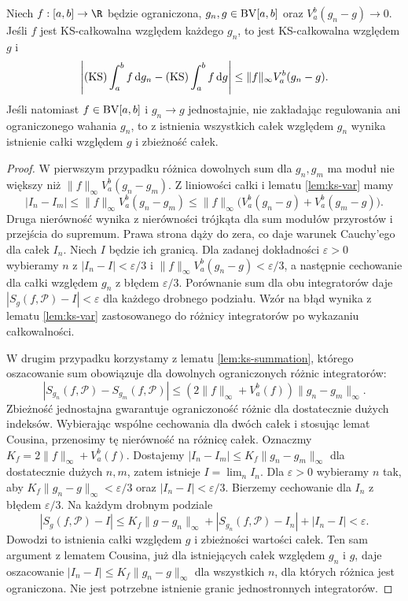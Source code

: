 \begin{twierdzenie}\label{ma1:kh:thm:ks-integrator-limit}
Niech $f:[a,b]\to\R$ będzie ograniczona, $g_n,g\in\mathrm{BV}[a,b]$ oraz $V_a^b(g_n-g)\to0$. Jeśli $f$ jest KS-całkowalna względem każdego $g_n$, to jest KS-całkowalna względem $g$ i
\[
 \left|(\mathrm{KS})\int_a^b f\,\mathrm dg_n-(\mathrm{KS})\int_a^b f\,\mathrm dg\right|
 \le\|f\|_\infty V_a^b(g_n-g).
\]
Jeśli natomiast $f\in\mathrm{BV}[a,b]$ i $g_n\to g$ jednostajnie, nie zakładając regulowania ani ograniczonego wahania $g_n$, to z istnienia wszystkich całek względem $g_n$ wynika istnienie całki względem $g$ i zbieżność całek.
\end{twierdzenie}
\begin{proof}
W pierwszym przypadku różnica dowolnych sum dla $g_n,g_m$ ma moduł nie większy niż $\|f\|_\infty V_a^b(g_n-g_m)$. Z liniowości całki i lematu \ref{lem:ks-var} mamy
\[
 |I_n-I_m|
 \le\|f\|_\infty V_a^b(g_n-g_m)
 \le\|f\|_\infty\bigl(V_a^b(g_n-g)+V_a^b(g_m-g)\bigr).
\]
Druga nierówność wynika z nierówności trójkąta
dla sum modułów przyrostów i przejścia do supremum.
Prawa strona dąży do zera, co daje warunek Cauchy'ego
dla całek $I_n$. Niech $I$ będzie ich granicą. Dla zadanej dokładności $\varepsilon>0$ wybieramy $n$ z $|I_n-I|<\varepsilon/3$ i $\|f\|_\infty V_a^b(g_n-g)<\varepsilon/3$, a następnie cechowanie dla całki względem $g_n$ z błędem $\varepsilon/3$. Porównanie sum dla obu integratorów daje $|S_g(f,\mathcal P)-I|<\varepsilon$ dla każdego drobnego podziału. Wzór na błąd wynika z lematu \ref{lem:ks-var} zastosowanego do różnicy integratorów po wykazaniu całkowalności.

W drugim przypadku korzystamy z lematu \ref{lem:ks-summation}, którego oszacowanie sum obowiązuje dla dowolnych ograniczonych różnic integratorów:
\[
 |S_{g_n}(f,\mathcal P)-S_{g_m}(f,\mathcal P)|
 \le (2\|f\|_\infty+V_a^b(f))\|g_n-g_m\|_\infty.
\]
Zbieżność jednostajna gwarantuje ograniczoność różnic dla dostatecznie dużych indeksów. Wybierając wspólne cechowania dla dwóch całek i stosując lemat Cousina, przenosimy tę nierówność na różnicę całek. Oznaczmy $K_f=2\|f\|_\infty+V_a^b(f)$.
Dostajemy $|I_n-I_m|\le K_f\|g_n-g_m\|_\infty$
dla dostatecznie dużych $n,m$, zatem istnieje
$I=\lim_n I_n$. Dla $\varepsilon>0$ wybieramy $n$
tak, aby $K_f\|g_n-g\|_\infty<\varepsilon/3$ oraz
$|I_n-I|<\varepsilon/3$. Bierzemy cechowanie dla $I_n$
z błędem $\varepsilon/3$. Na każdym drobnym podziale
\[
 |S_g(f,\mathcal P)-I|
 \le K_f\|g-g_n\|_\infty+
 |S_{g_n}(f,\mathcal P)-I_n|+|I_n-I|<\varepsilon .
\]
Dowodzi to istnienia całki względem $g$ i zbieżności
wartości całek. Ten sam argument z lematem Cousina,
już dla istniejących całek względem $g_n$ i $g$,
daje oszacowanie $|I_n-I|\le K_f\|g_n-g\|_\infty$
dla wszystkich $n$, dla których różnica jest ograniczona.
Nie jest potrzebne istnienie granic jednostronnych
integratorów.
\end{proof}
